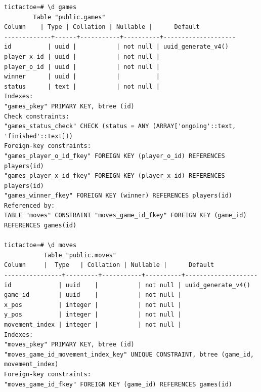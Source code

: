 \documentclass[12pt,a4paper]{article}
\begin{document}
\begin{flushleft}
\begin{lstlisting}[style=terminalStyle]
tictactoe=# \d games
        Table "public.games"
Column    | Type | Collation | Nullable |      Default
-------------+------+-----------+----------+--------------------
id          | uuid |           | not null | uuid_generate_v4()
player_x_id | uuid |           | not null |
player_o_id | uuid |           | not null |
winner      | uuid |           |          |
status      | text |           | not null |
Indexes:
"games_pkey" PRIMARY KEY, btree (id)
Check constraints:
"games_status_check" CHECK (status = ANY (ARRAY['ongoing'::text, 'finished'::text]))
Foreign-key constraints:
"games_player_o_id_fkey" FOREIGN KEY (player_o_id) REFERENCES players(id)
"games_player_x_id_fkey" FOREIGN KEY (player_x_id) REFERENCES players(id)
"games_winner_fkey" FOREIGN KEY (winner) REFERENCES players(id)
Referenced by:
TABLE "moves" CONSTRAINT "moves_game_id_fkey" FOREIGN KEY (game_id) REFERENCES games(id)

tictactoe=# \d moves
           Table "public.moves"
Column     |  Type   | Collation | Nullable |      Default
----------------+---------+-----------+----------+--------------------
id             | uuid    |           | not null | uuid_generate_v4()
game_id        | uuid    |           | not null |
x_pos          | integer |           | not null |
y_pos          | integer |           | not null |
movement_index | integer |           | not null |
Indexes:
"moves_pkey" PRIMARY KEY, btree (id)
"moves_game_id_movement_index_key" UNIQUE CONSTRAINT, btree (game_id, movement_index)
Foreign-key constraints:
"moves_game_id_fkey" FOREIGN KEY (game_id) REFERENCES games(id)
\end{lstlisting}


\end{flushleft}
\end{document}
